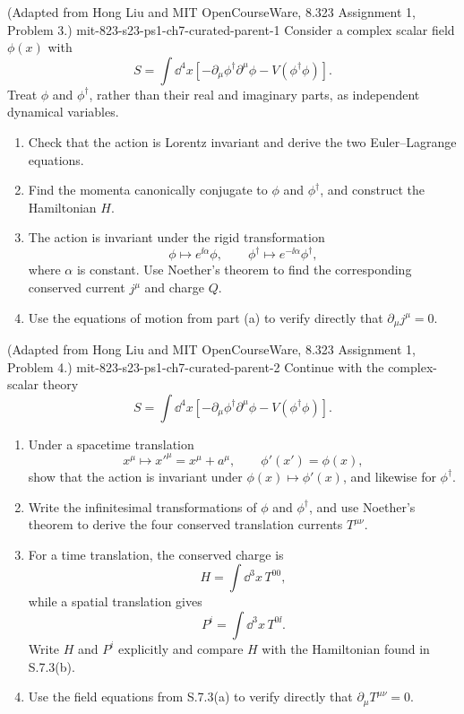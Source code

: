 \begin{enumerate}
  {(Adapted from Hong Liu and MIT OpenCourseWare, 8.323 Assignment 1, Problem 3.)}
  {mit-823-s23-ps1-ch7-curated-parent-1}
Consider a complex scalar field \(\phi(x)\) with
\[
 S=\int \dd^4x\left[
 -\partial_\mu\phi^\dagger\partial^\mu\phi
 -V(\phi^\dagger\phi)\right].
\]
Treat \(\phi\) and \(\phi^\dagger\), rather than their real and
imaginary parts, as independent dynamical variables.
\begin{enumerate}
\item
Check that the action is Lorentz invariant and derive the two
Euler--Lagrange equations.
\item
Find the momenta canonically conjugate to \(\phi\) and
\(\phi^\dagger\), and construct the Hamiltonian \(H\).
\item
The action is invariant under the rigid transformation
\[
 \phi\longmapsto e^{\ii\alpha}\phi,\qquad
 \phi^\dagger\longmapsto e^{-\ii\alpha}\phi^\dagger,
\]
where \(\alpha\) is constant.  Use Noether's theorem to find the
corresponding conserved current \(j^\mu\) and charge \(Q\).
\item
Use the equations of motion from part (a) to verify directly that
\(\partial_\mu j^\mu=0\).
\end{enumerate}

  {(Adapted from Hong Liu and MIT OpenCourseWare, 8.323 Assignment 1, Problem 4.)}
  {mit-823-s23-ps1-ch7-curated-parent-2}
Continue with the complex-scalar theory
\[
 S=\int \dd^4x\left[
 -\partial_\mu\phi^\dagger\partial^\mu\phi
 -V(\phi^\dagger\phi)\right].
\]
\begin{enumerate}
\item
Under a spacetime translation
\[
 x^\mu\longmapsto x'^\mu=x^\mu+a^\mu,
\qquad
 \phi'(x')=\phi(x),
\]
show that the action is invariant under
\(\phi(x)\mapsto\phi'(x)\), and likewise for \(\phi^\dagger\).
\item
Write the infinitesimal transformations of \(\phi\) and
\(\phi^\dagger\), and use Noether's theorem to derive the four
conserved translation currents \(T^{\mu\nu}\).
\item
For a time translation, the conserved charge is
\[
 H=\int \dd^3x\,T^{00},
\]
while a spatial translation gives
\[
 P^i=\int \dd^3x\,T^{0\ii}.
\]
Write \(H\) and \(P^i\) explicitly and compare \(H\) with the
Hamiltonian found in S.7.3(b).
\item
Use the field equations from S.7.3(a) to verify directly that
\(\partial_\mu T^{\mu\nu}=0\).
\end{enumerate}


\end{enumerate}
